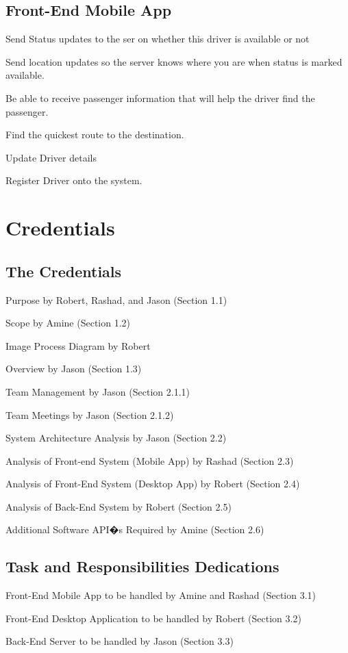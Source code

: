 \documentclass[a4paper,12pt]{article}
\begin{document}
\subsection{Front-End Mobile App}
\begin{description}
\setlength\itemsep{0em}
\item Send Status updates to the ser on whether this driver is available or not
\item Send location updates so the server knows where you are when status is marked available.
\item Be able to receive passenger information that will help the driver find the passenger.
\item Find the quickest route to the destination.
\item Update Driver details
\item Register Driver onto the system.
\end{description}

\pagebreak
\section{Credentials}
\subsection{The Credentials}
\begin{description}
\setlength\itemsep{0em}
\item Purpose by Robert, Rashad, and Jason (Section 1.1)
\item Scope by Amine (Section 1.2)
\item Image Process Diagram by Robert
\item Overview by Jason (Section 1.3)
\item Team Management by Jason (Section 2.1.1)
\item Team Meetings by Jason (Section 2.1.2)
\item System Architecture Analysis by Jason (Section 2.2)
\item Analysis of Front-end System (Mobile App) by Rashad (Section 2.3)
\item Analysis of Front-End System (Desktop App) by Robert (Section 2.4)
\item Analysis of Back-End System by Robert (Section 2.5)
\item Additional Software API�s Required by Amine (Section 2.6)
\end{description}
\subsection{Task and Responsibilities Dedications}
\begin{description}
\setlength\itemsep{0em}
\item Front-End Mobile App to be handled by Amine and Rashad (Section 3.1)
\item Front-End Desktop Application to be handled by Robert (Section 3.2)
\item Back-End Server to be handled by Jason (Section 3.3)
\end{description}
\end{document}

